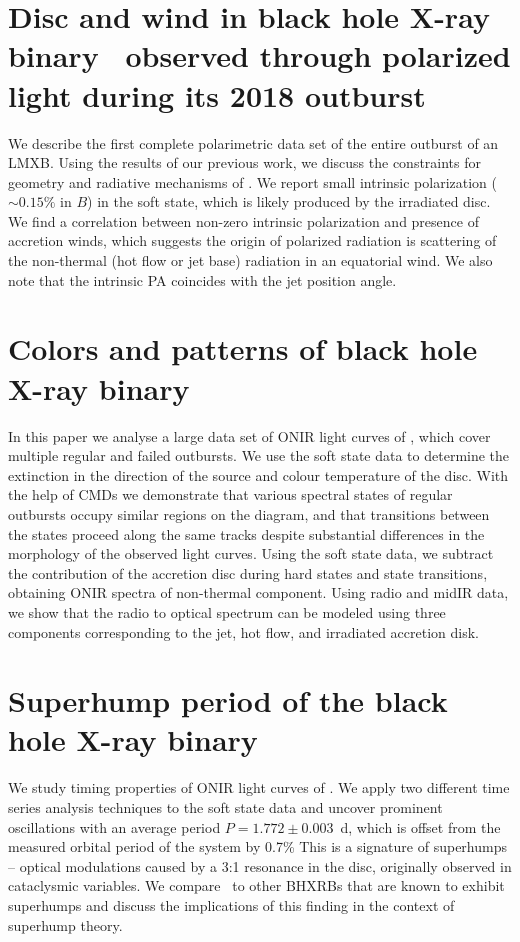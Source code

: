 \section{Disc and wind in black hole X-ray binary \MAXI\ observed through polarized light during its 2018 outburst }
We describe the first complete polarimetric data set of the entire outburst of an \gls{LMXB}.
Using the results of our previous work, we discuss the constraints for geometry and radiative mechanisms of \MAXI.
We report small intrinsic polarization ($\sim 0.15\%$ in $B$) in the soft state, which is likely produced by the irradiated disc.
We find a correlation between non-zero intrinsic polarization and presence of accretion winds, which suggests the origin of polarized radiation is scattering of the non-thermal (hot flow or jet base) radiation in an equatorial wind. 
We also note that the intrinsic \gls{PA} coincides with the jet position angle.

\section{Colors and patterns of black hole X-ray binary \GX}
In this paper we analyse a large data set of \gls{ONIR} light curves of \GX, which cover multiple regular and failed outbursts.
We use the soft state data to determine the extinction in the direction of the source and colour temperature of the disc.
With the help of \glspl{CMD} we demonstrate that various spectral states of regular outbursts occupy similar regions on the diagram, and that transitions between the states proceed along the same tracks despite substantial differences in the morphology of the observed light curves.
Using the soft state data, we subtract the contribution of the accretion disc during hard states and state transitions, obtaining \gls{ONIR} spectra of non-thermal component.
Using radio and \gls{midIR} data, we show that the radio to optical spectrum can be modeled using three components corresponding to the jet, hot flow, and irradiated accretion disk. 

\section{Superhump period of the black hole X-ray binary \GX }
We study timing properties of \gls{ONIR} light curves of \GX.
We apply two different time series analysis techniques to the soft state data and uncover prominent oscillations with an average period $P = 1.772 \pm 0.003$~d, which is offset from the measured orbital period of the system by 0.7\%
This is a signature of superhumps -- optical modulations caused by a 3:1 resonance in the disc, originally observed in cataclysmic variables.
We compare \GX\ to other \glspl{BHXRB} that are known to exhibit superhumps and  discuss the implications of this finding in the context of superhump theory.

